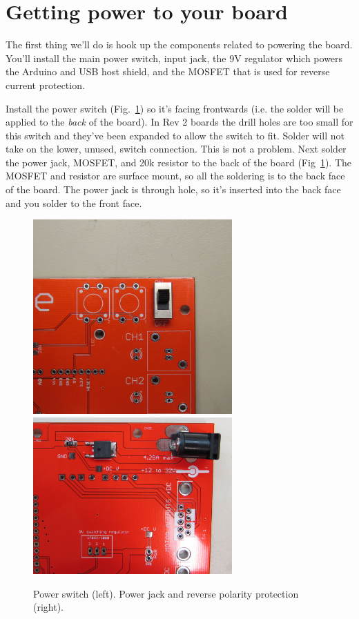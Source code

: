 \documentclass[11pt]{report} %
\begin{document}
\section{Getting power to your board}
The first thing we'll do is hook up the components related to powering the board. You'll install the main power switch, input jack, the 9V regulator which powers the Arduino and USB host shield, and the MOSFET that is used for reverse current protection. 

Install the power switch (Fig.~\ref{switch}) so it's facing frontwards (i.e. the solder will be applied to the \textit{back} of the board). In Rev 2 boards the drill holes are too small for this switch and they've been expanded to allow the switch to fit. Solder will not take on the lower, unused, switch connection. This is not a problem. Next solder the power jack, MOSFET, and 20k resistor to the back of the board (Fig~\ref{switch}). The MOSFET and resistor are surface mount, so all the soldering is to the back face of the board. The power jack is through hole, so it's inserted into the back face and you solder to the front face. 



\begin{figure}[!ht]
\centering
\includegraphics[width=3in]{IMG_3194.JPG}
\includegraphics[width=3in]{IMG_3190.JPG}

\caption{Power switch (left). Power jack and reverse polarity protection (right).}
\label{switch}
\end{figure}
\end{document}
